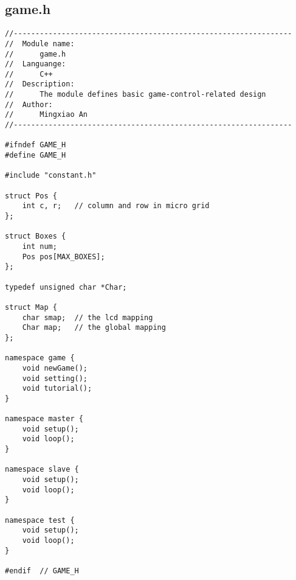 \subsection{game.h}
\begin{verbatim}
//----------------------------------------------------------------
//  Module name:
//      game.h
//  Languange:
//      C++
//  Description:
//      The module defines basic game-control-related design
//  Author:
//      Mingxiao An
//----------------------------------------------------------------

#ifndef GAME_H
#define GAME_H

#include "constant.h"

struct Pos {
    int c, r;   // column and row in micro grid
};

struct Boxes {
    int num;
    Pos pos[MAX_BOXES];
};

typedef unsigned char *Char;

struct Map {
    char smap;  // the lcd mapping
    Char map;   // the global mapping
};

namespace game {
    void newGame();
    void setting();
    void tutorial();
}

namespace master {
    void setup();
    void loop();
}

namespace slave {
    void setup();
    void loop();
}

namespace test {
    void setup();
    void loop();
}

#endif  // GAME_H
\end{verbatim}

